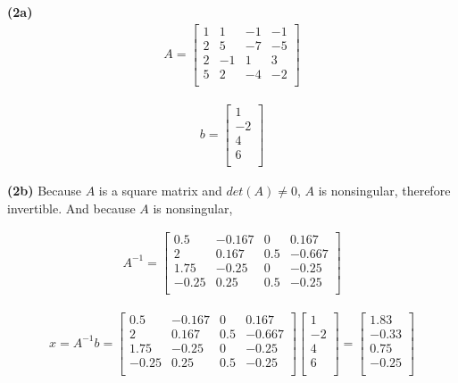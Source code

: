 \documentclass[12pt,article]{article}
\begin{document}
\textbf{(2a)} \newline
\begin{align*}
A =     
    \begin{bmatrix}
        1 & 1 & -1 & -1 \\
        2 & 5 & -7 & -5 \\
        2 & -1 & 1 & 3 \\
        5 & 2 & -4 & -2 \\
    \end{bmatrix}
\end{align*}

\begin{align*}
    b =     
        \begin{bmatrix}
            1  \\
            -2  \\
            4 \\
            6  \\
        \end{bmatrix}
    \end{align*}

\textbf{(2b)}
Because $A$ is a square matrix and $det(A) \neq 0$, $A$ is nonsingular, 
therefore invertible. And because $A$ is nonsingular, 

\begin{align*}
    A^{-1} = 
    \begin{bmatrix}
        0.5     & -0.167    & 0     & 0.167 \\
        2       & 0.167     & 0.5   & -0.667 \\
        1.75    & -0.25     & 0     & -0.25 \\
        -0.25   & 0.25      & 0.5   & -0.25 \\
    \end{bmatrix}
\end{align*}

\begin{align*}
x = A^{-1}b =
    \left[\begin{array}{cccc}
        0.5     & -0.167    & 0     & 0.167 \\
        2       & 0.167     & 0.5   & -0.667 \\
        1.75    & -0.25     & 0     & -0.25 \\
        -0.25   & 0.25      & 0.5   & -0.25 \\
    \end{array}\right]
    \begin{bmatrix}
        1 \\
        -2 \\
        4 \\
        6 \\
    \end{bmatrix}
    =
    \begin{bmatrix}
        1.83  \\
        -0.33  \\
        0.75 \\
        -0.25  \\
    \end{bmatrix}
\end{align*}
\end{document}
